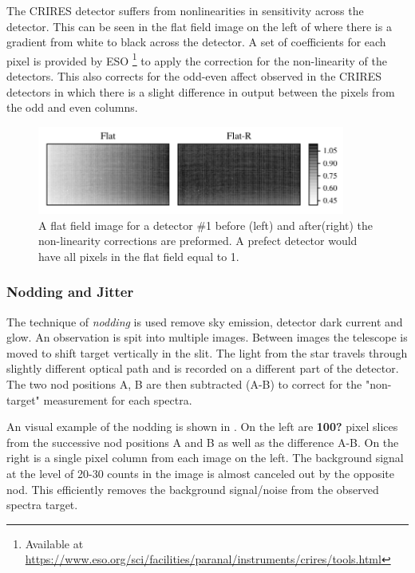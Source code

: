 The CRIRES detector suffers from nonlinearities in sensitivity across the detector. This can be seen in the flat field image on the left of  where there is a gradient from white to black across the detector. A set of coefficients for each pixel is provided by ESO \footnote{Available at \href{https://www.eso.org/sci/facilities/paranal/instruments/crires/tools.html}{https://www.eso.org/sci/facilities/paranal/instruments/crires/tools.html}} to apply the correction for the non-linearity of the detectors. This also corrects for the odd-even affect observed in the CRIRES detectors in which there is a slight difference in output between the pixels from the odd and even columns. 

\begin{figure}[h]
    \centering
    \includegraphics[width=0.9\textwidth]{figures/reduction/master_flats_1.pdf}
    \caption{A flat field image for a detector \#1 before (left) and after(right) the non-linearity corrections are preformed. A prefect detector would have all pixels in the flat field equal to 1.}
    \label{fig:masterflats}
\end{figure}


\subsubsection{Nodding and Jitter}
The technique of \emph{nodding} is used remove sky emission, detector dark current and glow. An observation is spit into multiple images. Between images the telescope is moved to shift target vertically in the slit. The light from the star travels through slightly different optical path and is recorded on a different part of the detector. The two nod positions A, B are then subtracted (A-B) to correct for the "non-target" measurement for each spectra.

An visual example of the nodding is shown in . On the left are \textbf{100?} pixel slices from the successive nod positions A and B as well as the difference A-B. On the right is a single pixel column from each image on the left. The background signal at the level of 20-30 counts in the image is almost canceled out by the opposite nod. This efficiently removes the background signal/noise from the observed spectra target. 

